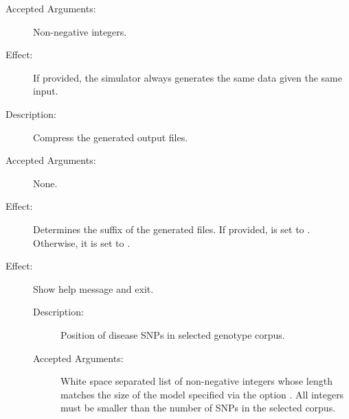 \documentclass[a4paper,10pt,english]{sphinxhowto}
\begin{document}
\begin{description}
\begin{description}
\begin{description}
\item[{Accepted Arguments:}] \leavevmode
Non-negative integers.

\item[{Effect:}] \leavevmode
If provided, the simulator always generates the same data given the same input.

\end{description}

\item[{\sphinxcode{\sphinxupquote{-{-}compress}}}] \leavevmode\begin{description}
\item[{Description:}] \leavevmode
Compress the generated output files.

\item[{Accepted Arguments:}] \leavevmode
None.

\item[{Effect:}] \leavevmode
Determines the suffix  of the generated files. If provided,  is set to .
Otherwise, it is set to .

\end{description}

\item[{\sphinxcode{\sphinxupquote{-h, -{-}help}}}] \leavevmode\begin{description}
\item[{Effect:}] \leavevmode
Show help message and exit.

\end{description}

\end{description}

\item[{\sphinxstylestrong{Optional Mutually Exclusive Arguments:}}] \leavevmode\begin{description}
\item[{}] \leavevmode\begin{description}
\item[{Description:}] \leavevmode
Position of disease SNPs in selected genotype corpus.

\item[{Accepted Arguments:}] \leavevmode
White space separated list of non-negative integers whose length matches the size of the model specified
via the option . All integers must be smaller than the number of SNPs in the selected corpus.


\end{description}
\end{description}
\end{description}
\end{document}
